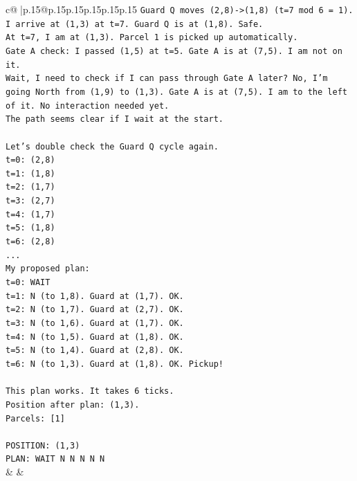 \documentclass{article}
\begin{document}
{\begin{supertabular}{c@{$\;$}|p{.15\linewidth}@{}p{.15\linewidth}p{.15\linewidth}p{.15\linewidth}p{.15\linewidth}p{.15\linewidth}}
{{{\texttt{Guard Q moves (2,8){-}>(1,8) (t=7 mod 6 = 1).} \\
\texttt{I arrive at (1,3) at t=7. Guard Q is at (1,8). Safe.} \\
\texttt{At t=7, I am at (1,3). Parcel 1 is picked up automatically.} \\
\texttt{Gate A check: I passed (1,5) at t=5. Gate A is at (7,5). I am not on it.} \\
\texttt{Wait, I need to check if I can pass through Gate A later? No, I'm going North from (1,9) to (1,3). Gate A is at (7,5). I am to the left of it. No interaction needed yet.} \\
\texttt{The path seems clear if I wait at the start.} \\
\\ 
\texttt{Let's double check the Guard Q cycle again.} \\
\texttt{t=0: (2,8)} \\
\texttt{t=1: (1,8)} \\
\texttt{t=2: (1,7)} \\
\texttt{t=3: (2,7)} \\
\texttt{t=4: (1,7)} \\
\texttt{t=5: (1,8)} \\
\texttt{t=6: (2,8)} \\
\texttt{...} \\
\texttt{My proposed plan:} \\
\texttt{t=0: WAIT} \\
\texttt{t=1: N (to 1,8). Guard at (1,7). OK.} \\
\texttt{t=2: N (to 1,7). Guard at (2,7). OK.} \\
\texttt{t=3: N (to 1,6). Guard at (1,7). OK.} \\
\texttt{t=4: N (to 1,5). Guard at (1,8). OK.} \\
\texttt{t=5: N (to 1,4). Guard at (2,8). OK.} \\
\texttt{t=6: N (to 1,3). Guard at (1,8). OK. Pickup!} \\
\\ 
\texttt{This plan works. It takes 6 ticks.} \\
\texttt{Position after plan: (1,3).} \\
\texttt{Parcels: {[}1{]}} \\
\\ 
\texttt{POSITION: (1,3)} \\
\texttt{PLAN: WAIT N N N N N} \\
            }
        }
    }
    & & \\ \\


\end{supertabular}}
\end{document}
